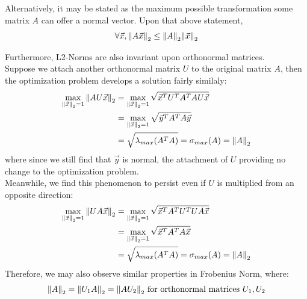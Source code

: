 Alternatively, it may be stated as the maximum possible transformation some matrix $A$ can offer a normal vector.
Upon that above statement,
\[
    \forall \vec{x}, {\| A \vec{x} \|}_{2}^{} \leq {\| A \|}_{2}^{} {\| \vec{x} \|}_{2}^{}
\]
\par
Furthermore, L2-Norms are also invariant upon orthonormal matrices. \\
Suppose we attach another orthonormal matrix $U$ to the original matrix $A$, then the optimization problem develops a solution fairly similaly:
\begin{align*}
    \max_{{\| \vec{x} \|}_{2}^{} = 1} {\| AU \vec{x} \|}_{2}^{}
    &= \max_{{\| \vec{x} \|}_{2}^{} = 1} \sqrt{\vec{x}^T U^T A^T A U \vec{x}} \\
    &= \max_{{\| \vec{x} \|}_{2}^{} = 1} \sqrt{\vec{y}^T A^T A \vec{y}} \\
    &= \sqrt{\lambda_{max}(A^T A)} = \sigma_{max}(A) = {\| A \|}_{2}^{}
\end{align*}
where since we still find that $\vec{y}$ is normal, the attachment of $U$ providing no change to the optimization problem. \\
Meanwhile, we find this phenomenon to persist even if $U$ is multiplied from an opposite direction:
\begin{align*}
    \max_{{\| \vec{x} \|}_{2}^{} = 1} {\| UA \vec{x} \|}_{2}^{}
    &= \max_{{\| \vec{x} \|}_{2}^{} = 1} \sqrt{\vec{x}^T A^T U^T U A \vec{x}} \\
    &= \max_{{\| \vec{x} \|}_{2}^{} = 1} \sqrt{\vec{x}^T A^T A \vec{x}} \\
    &= \sqrt{\lambda_{max}(A^T A)} = \sigma_{max}(A) = {\| A \|}_{2}^{}
\end{align*}
Therefore, we may also observe similar properties in Frobenius Norm, where:
\[
    {\| A \|}_{2}^{} = {\| U_1A \|}_{2}^{} = {\| AU_2 \|}_{2}^{} \text{ for orthonormal matrices } U_1, U_2
\]
